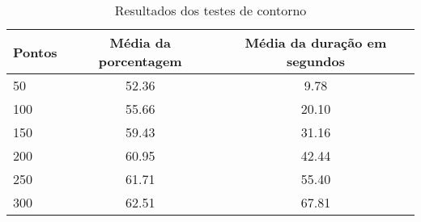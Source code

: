 \begin{table}[h]
    \centering
    \caption{Resultados dos testes de contorno}
    \label{tab:resultados-contorno}
    \begin{tabular}{|l|c|c|}
        \hline
        {Pontos} & {Média da porcentagem} & {Média da duração em segundos} \\
        \hline
        50 & 52.36 & 9.78\\
        100 & 55.66 & 20.10\\
        150 & 59.43 & 31.16\\
        200 & 60.95 & 42.44\\
        250 & 61.71 & 55.40\\
        300 & 62.51 & 67.81\\
        \hline
    \end{tabular}
\end{table}
